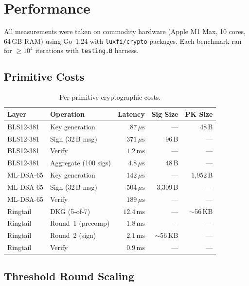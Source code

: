 \section{Performance}

\label{sec:performance}

All measurements were taken on commodity hardware (Apple M1 Max, 10 cores,
64\,GB RAM) using Go~1.24 with \texttt{luxfi/crypto} packages. Each
benchmark ran for $\geq 10^4$ iterations with \texttt{testing.B} harness.

\subsection{Primitive Costs}

\begin{table}[ht]
\centering
\begin{tabular}{@{}llrrr@{}}
\toprule
\textbf{Layer} & \textbf{Operation} & \textbf{Latency} & \textbf{Sig Size} & \textbf{PK Size} \\
\midrule
BLS12-381  & Key generation & $87\,\mu\text{s}$  & --- & 48\,B \\
BLS12-381  & Sign (32\,B msg) & $371\,\mu\text{s}$ & 96\,B & --- \\
BLS12-381  & Verify & $1.2\,\text{ms}$ & --- & --- \\
BLS12-381  & Aggregate (100 sigs) & $4.8\,\mu\text{s}$ & 48\,B & --- \\
\midrule
ML-DSA-65  & Key generation & $142\,\mu\text{s}$ & --- & 1{,}952\,B \\
ML-DSA-65  & Sign (32\,B msg) & $504\,\mu\text{s}$ & 3{,}309\,B & --- \\
ML-DSA-65  & Verify & $189\,\mu\text{s}$ & --- & --- \\
\midrule
Ringtail   & DKG (5-of-7)     & $12.4\,\text{ms}$ & --- & $\sim$56\,KB \\
Ringtail   & Round~1 (precomp) & $1.8\,\text{ms}$ & --- & --- \\
Ringtail   & Round~2 (sign)    & $2.1\,\text{ms}$ & $\sim$56\,KB & --- \\
Ringtail   & Verify             & $0.9\,\text{ms}$ & --- & --- \\
\bottomrule
\end{tabular}
\caption{Per-primitive cryptographic costs.}
\label{tab:primitives}
\end{table}

\subsection{Threshold Round Scaling}

